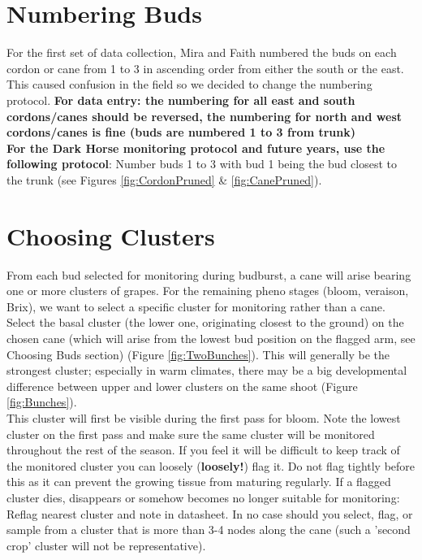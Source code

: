 \documentclass[11pt,letter]{article}
\begin{document}
\section{Numbering Buds}
For the first set of data collection, Mira and Faith numbered the buds on each cordon or cane from 1 to 3 in ascending order from either the south or the east. This caused confusion in the field so we decided to change the numbering protocol. {\bf For data entry: the numbering for all east and south cordons/canes should be reversed, the numbering for north and west cordons/canes is fine (buds are numbered 1 to 3 from trunk)} \\

{\bf For the Dark Horse monitoring protocol and future years, use the following protocol}:
Number buds 1 to 3 with bud 1 being the bud closest to the trunk (see Figures \ref{fig:CordonPruned} \& \ref{fig:CanePruned}). 

\section{Choosing Clusters}
From each bud selected for monitoring during budburst, a cane will arise bearing one or more clusters of grapes. For the remaining pheno stages (bloom, veraison, Brix), we want to select a specific cluster for monitoring rather than a cane. Select the basal cluster (the lower one, originating closest to the ground) on the chosen cane (which will arise from the lowest bud position on the flagged arm, see Choosing Buds section) (Figure \ref{fig:TwoBunches}). This will generally be the strongest cluster; especially in warm climates, there may be a big developmental difference between upper and lower clusters on the same shoot (Figure \ref{fig:Bunches}). \\

This cluster will first be visible during the first pass for bloom. Note the lowest cluster on the first pass and make sure the same cluster will be monitored throughout the rest of the season. If you feel it will be difficult to keep track of the monitored cluster you can loosely ({\bf loosely!}) flag it. Do not flag tightly before this as it can prevent the growing tissue from maturing regularly. If a flagged cluster dies, disappears or somehow becomes no longer suitable for monitoring: Reflag nearest cluster and note in datasheet. In no case should you select, flag, or sample from a cluster that is more than 3-4 nodes along the cane (such a 'second crop' cluster will not be representative). \\
\end{document}

